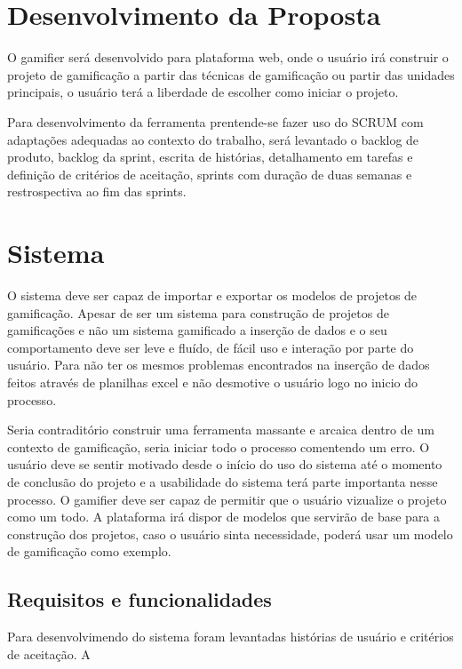 \section[Desenvolvimento da Proposta]{Desenvolvimento da Proposta}

O gamifier será desenvolvido para plataforma web, onde o usuário irá construir o projeto de gamificação a partir das técnicas de gamificação ou partir das unidades principais, o usuário terá a liberdade de escolher como iniciar o projeto. 

Para desenvolvimento da ferramenta prentende-se fazer uso do SCRUM com adaptações adequadas ao contexto do trabalho, será levantado o backlog de produto, backlog da sprint, escrita de histórias, detalhamento em tarefas e definição de critérios de aceitação, sprints com duração de duas semanas e restrospectiva ao fim das sprints.

\section{Sistema}

O sistema deve ser capaz de importar e exportar os modelos de projetos de gamificação. Apesar de ser um sistema para construção de projetos de gamificações e não um sistema gamificado a inserção de dados e o seu comportamento deve ser leve e fluído, de fácil uso  e interação por parte do usuário. Para não ter os mesmos problemas encontrados na inserção de dados feitos através de planilhas excel e não desmotive o usuário logo no inicio do processo. 

Seria contraditório construir uma ferramenta massante e arcaica dentro de um contexto de gamificação, seria iniciar todo o processo comentendo um erro. O usuário deve se sentir motivado desde o início do uso do sistema até o momento de conclusão do projeto e a usabilidade do sistema terá parte importanta nesse processo. O gamifier deve ser capaz de permitir que o usuário vizualize o projeto como um todo.  A plataforma irá dispor de modelos que servirão de base para a construção dos projetos, caso o usuário sinta necessidade, poderá usar um modelo de gamificação como exemplo. 



\subsection{Requisitos e funcionalidades}
Para desenvolvimendo do sistema foram levantadas histórias de usuário e critérios de aceitação. A



